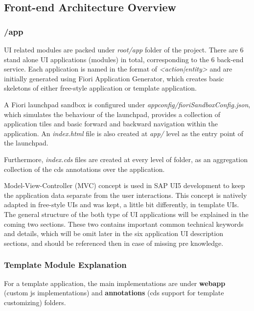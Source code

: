 \subsection{Front-end Architecture Overview}

\subsubsection{/app}

UI related modules are packed under \textit{root/app} folder of the project. There are 6 stand alone UI applications (modules) in total, corresponding to the 6 back-end service. Each application is named in the format of \textit{<action|entity>} and are initially generated using Fiori Application Generator, which creates basic skeletons of either free-style application or template application. 

A Fiori launchpad sandbox is configured under \textit{appconfig/fioriSandboxConfig.json}, which simulates the behaviour of the launchpad, provides a collection of application tiles and basic forward and backward navigation within the application. An \textit{index.html} file is also created at \textit{app/} level as the entry point of the launchpad.

Furthermore, \textit{index.cds} files are created at every level of folder, as an aggregation collection of the cds annotations over the application.

Model-View-Controller (MVC) concept is used in SAP UI5 development to keep the application data separate from the user interactions. This concept is natively adapted in free-style UIs and was kept, a little bit differently, in template UIs. The general structure of the both type of UI applications will be explained in the coming two sections. These two contains important common technical keywords and details, which will be omit later in the six application UI description sections, and should be referenced then in case of missing pre knowledge.

\subsubsection{Template Module Explanation}

For a template application, the main implementations are under \textbf{webapp} (custom js implementations) and \textbf{annotations} (cds support for template customizing) folders.

